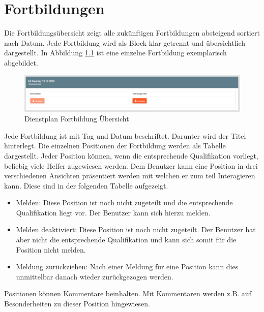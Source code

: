 \chapter{Fortbildungen}
\label{cha:fortbildungen}
Die Fortbildungsübersicht zeigt alle zukünftigen Fortbildungen absteigend sortiert nach Datum. Jede Fortbildung wird als Block klar getrennt und übersichtlich dargestellt. In Abbildung \ref{fig:view_training} \textit{} ist eine einzelne Fortbildung exemplarisch abgebildet.

\begin{figure}[h]
 \begin{addmargin}{-0.2\linewidth}
   \centering 
   \includegraphics[width=20cm]{Bilder/view_training.png}
 \end{addmargin} 
 \caption[Fortbildungen Übersicht]{Dienstplan Fortbildung Übersicht}
 \label{fig:view_training}
\end{figure}

\noindent Jede Fortbildung ist mit Tag und Datum beschriftet. Darunter wird der Titel hinterlegt. Die einzelnen Positionen der Fortbildung werden als Tabelle dargestellt. Jeder Position können, wenn die entsprechende Qualifikation vorliegt, beliebig viele Helfer zugewiesen werden.
\noindent Dem Benutzer kann eine Position in drei verschiedenen Ansichten präsentiert werden mit welchen er zum teil Interagieren kann.
Diese sind in der folgenden Tabelle aufgezeigt.

\begin{itemize}
\item Melden: Diese Position ist noch nicht zugeteilt und die entsprechende Qualifikation liegt vor. Der Benutzer kann sich hierzu melden.
\item Melden deaktiviert: Diese Position ist noch nicht zugeteilt. Der Benutzer hat aber nicht die entsprechende Qualifikation und kann sich somit für die Position nicht melden.
\item Meldung zurückziehen: Nach einer Meldung für eine Position kann dies unmittelbar danach wieder zurückgezogen werden.
\end{itemize}

\noindent Positionen können Kommentare beinhalten. Mit Kommentaren werden z.B. auf Besonderheiten zu dieser Position hingewiesen.


